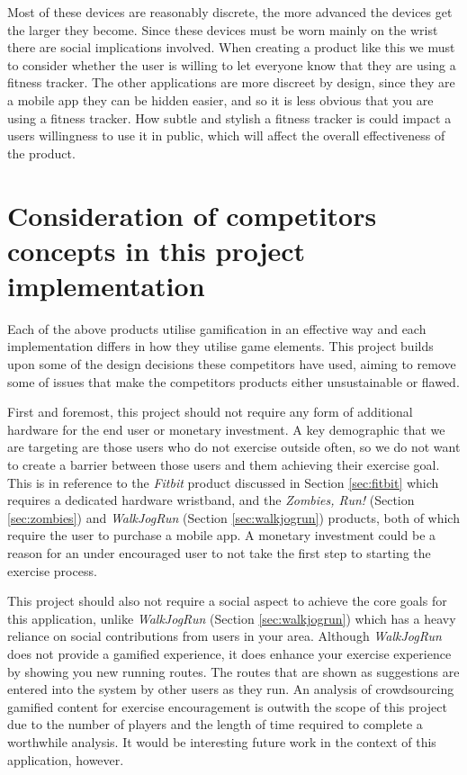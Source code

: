 Most of these devices are reasonably discrete, the more advanced the
devices get the larger they become. Since these devices must be worn
mainly on the wrist there are social implications involved. When
creating a product like this we must to consider whether the user
is willing to let everyone know that they are using a fitness tracker.
The other applications are more discreet by design, since they are a
mobile app they can be hidden easier, and so it is less obvious that
you are using a fitness tracker. How subtle and stylish a fitness
tracker is could impact a users willingness to use it in public, which
will affect the overall effectiveness of the product.

\section{Consideration of competitors concepts in this project
  implementation}
\label{sec:consideration}
Each of the above products utilise gamification in an effective way
and each implementation differs in how they utilise game
elements. This project builds upon some of the design decisions these
competitors have used, aiming to remove some of issues that make the
competitors products either unsustainable or flawed.

First and foremost, this project should not require any form of
additional hardware for the end user or monetary investment. A key
demographic that we are targeting are those users who do not exercise
outside often, so we do not want to create a barrier between those
users and them achieving their exercise goal. This is in reference to
the \emph{Fitbit} product discussed in Section \ref{sec:fitbit} which
requires a dedicated hardware wristband, and the \emph{Zombies, Run!}
(Section \ref{sec:zombies}) and \emph{WalkJogRun} (Section
\ref{sec:walkjogrun}) products, both of which require the user to
purchase a mobile app. A monetary investment could be a reason for an
under encouraged user to not take the first step to starting the
exercise process. 

This project should also not require a social aspect to achieve the
core goals for this application, unlike \emph{WalkJogRun} (Section
\ref{sec:walkjogrun}) which has a heavy reliance on social
contributions from users in your area. Although \emph{WalkJogRun} does not
provide a gamified experience, it does enhance your exercise
experience by showing you new running routes. The routes that are
shown as suggestions are entered into the system by other users as
they run. An analysis of crowdsourcing gamified content for exercise
encouragement is outwith the scope of this project due to the number
of players and the length of time required to complete a worthwhile
analysis. It would be interesting future work in the context of this
application, however. 

